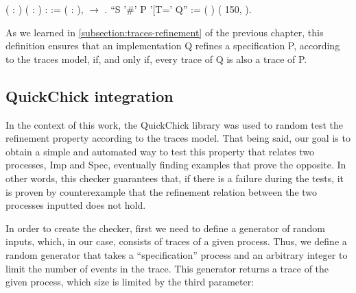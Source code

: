 \begin{coqdoccode}
	\coqdocnoindent
	  ( : ) (  : ) :  :=\coqdoceol
	\coqdocindent{1.00em}
	\coqdockw{\ensuremath{\forall}} ( : ),     \ensuremath{\rightarrow}    .\coqdoceol
	\coqdocemptyline
	\coqdocnoindent
	 ``S '\#' P '[T=' Q'' := (   ) (  150,  ).\coqdoceol
\end{coqdoccode}

As we learned in \autoref{subsection:traces-refinement} of the previous chapter, this definition ensures that an implementation Q refines a specification P, according to the traces model, if, and only if, every trace of Q is also a trace of P.

\subsection{QuickChick integration}

In the context of this work, the QuickChick library was used to random test the refinement property according to the traces model. That being said, our goal is to obtain a simple and automated way to test this property that relates two processes, Imp and Spec, eventually finding examples that prove the opposite. In other words, this checker guarantees that, if there is a failure during the tests, it is proven by counterexample that the refinement relation between the two processes inputted does not hold.

In order to create the checker, first we need to define a generator of random inputs, which, in our case, consists of traces of a given process. Thus, we define a random generator that takes a ``specification'' process and an arbitrary integer to limit the number of events in the trace. This generator returns a trace of the given process, which size is limited by the third parameter:

